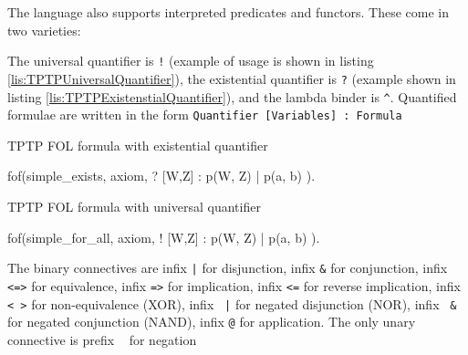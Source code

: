 The language also supports interpreted predicates and functors. These come in two varieties: 

The universal quantifier is \texttt{!} (example of usage is shown in listing \ref{lis:TPTPUniversalQuantifier}), the existential quantifier is \texttt{?} (example shown in listing \ref{lis:TPTPExistenstialQuantifier}), and the lambda binder is \texttt{^}. Quantified formulae are written in the form \texttt{Quantifier [Variables] :  Formula}

\begin{listing}[H]
  \caption{TPTP FOL formula with existential quantifier}
  \label{lis:TPTPExistenstialQuantifier}
\begin{tptpcode}
fof(simple_exists, axiom,
 ? [W,Z] : p(W, Z) | p(a, b)
  ).
\end{tptpcode}
\end{listing}

\begin{listing}[H]
  \caption{TPTP FOL formula with universal quantifier}
  \label{lis:TPTPUniversalQuantifier}
\begin{tptpcode}
fof(simple_for_all, axiom,
 ! [W,Z] : p(W, Z) | p(a, b)
  ).
\end{tptpcode}
\end{listing}
The binary connectives are infix \texttt{|} for disjunction, infix \texttt{&} for conjunction, infix \texttt{<=>} for equivalence, infix \texttt{=>} for implication, infix \texttt{<=} for reverse implication, infix \texttt{<~>} for non-equivalence (XOR), infix \texttt{~|} for negated disjunction (NOR), infix	\texttt{~&} for negated conjunction (NAND), infix \texttt{@} for application. The only unary connective is prefix \texttt{~} for negation


